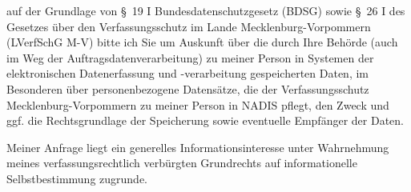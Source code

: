 auf der Grundlage von §~19 I Bundesdatenschutzgesetz (BDSG) sowie
§~26 I des Gesetzes über den Verfassungsschutz im Lande Mecklenburg-Vorpommern
(LVerfSchG M-V) bitte ich Sie um Auskunft über die durch Ihre Behörde (auch im Weg
der Auftragsdatenverarbeitung) zu meiner Person in Systemen der elektronischen Datenerfassung
und -verarbeitung gespeicherten Daten, im Besonderen über personenbezogene Datensätze,
die der Verfassungsschutz Mecklenburg-Vorpommern zu meiner Person in NADIS pflegt,
den Zweck und ggf. die Rechtsgrundlage der Speicherung sowie eventuelle Empfänger
der Daten.

Meiner Anfrage liegt ein generelles Informationsinteresse unter Wahrnehmung
meines verfassungsrechtlich verbürgten Grundrechts auf informationelle
Selbstbestimmung zugrunde.
